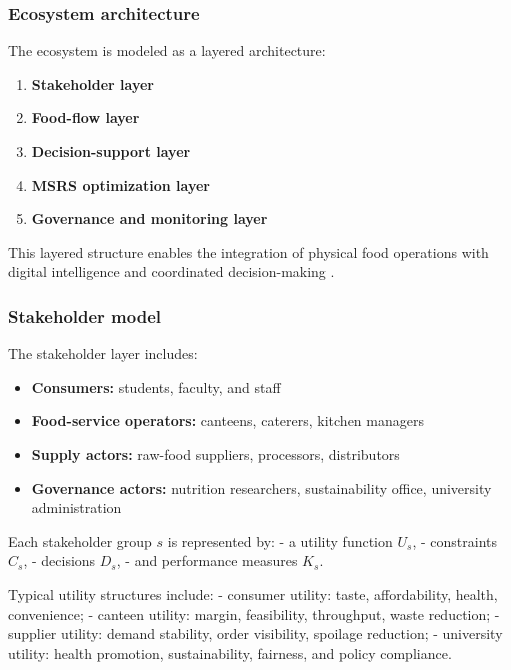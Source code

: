 \documentclass[journal]{IEEEtran}
\begin{document}
\subsubsection{Ecosystem architecture}\label{ecosystem-architecture}

The ecosystem is modeled as a layered architecture:

\begin{enumerate}
\def\labelenumi{\arabic{enumi}.}
\tightlist
\item
  \textbf{Stakeholder layer}
\item
  \textbf{Food-flow layer}
\item
  \textbf{Decision-support layer}
\item
  \textbf{MSRS optimization layer}
\item
  \textbf{Governance and monitoring layer}
\end{enumerate}

This layered structure enables the integration of physical food
operations with digital intelligence and coordinated decision-making
\cite{zheng2017msr, wu2021multifr}.

\subsubsection{Stakeholder model}\label{stakeholder-model}

The stakeholder layer includes:

\begin{itemize}
\tightlist
\item
  \textbf{Consumers:} students, faculty, and staff
\item
  \textbf{Food-service operators:} canteens, caterers, kitchen managers
\item
  \textbf{Supply actors:} raw-food suppliers, processors, distributors
\item
  \textbf{Governance actors:} nutrition researchers, sustainability
  office, university administration
\end{itemize}

Each stakeholder group \(s\) is represented by: - a utility function
\(U_s\), - constraints \(C_s\), - decisions \(D_s\), - and performance
measures \(K_s\).

Typical utility structures include: - consumer utility: taste,
affordability, health, convenience; - canteen utility: margin,
feasibility, throughput, waste reduction; - supplier utility: demand
stability, order visibility, spoilage reduction; - university utility:
health promotion, sustainability, fairness, and policy compliance.
\end{document}
